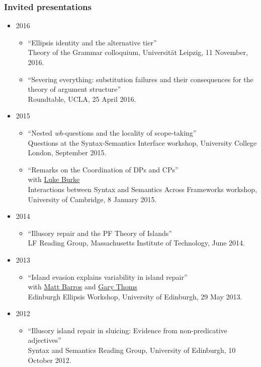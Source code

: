 \documentclass[]{article}
\providecommand{\tightlist}{%
  \setlength{\itemsep}{0pt}\setlength{\parskip}{0pt}}
\begin{document}
\subsubsection{Invited presentations}\label{invited-presentations}

\begin{itemize}
\tightlist
\item
  2016

  \begin{itemize}
  \tightlist
  \item
    ``Ellipsis identity and the alternative tier''\\
    Theory of the Grammar colloquium, Universität Leipzig, 11 November,
    2016.
  \item
    ``Severing everything: substitution failures and their consequences
    for the theory of argument structure''\\
    Roundtable, UCLA, 25 April 2016.
  \end{itemize}
\item
  2015

  \begin{itemize}
  \tightlist
  \item
    ``Nested \emph{wh}-questions and the locality of scope-taking''\\
    Questions at the Syntax-Semantics Interface workshop, University
    College London, September 2015.
  \item
    ``Remarks on the Coordination of DPs and CPs''\\
    with \href{...}{Luke Burke}\\
    Interactions between Syntax and Semantics Across Frameworks
    workshop, University of Cambridge, 8 January 2015.
  \end{itemize}
\item
  2014

  \begin{itemize}
  \tightlist
  \item
    ``Illusory repair and the PF Theory of Islands''\\
    LF Reading Group, Massachusetts Institute of Technology, June 2014.
  \end{itemize}
\item
  2013

  \begin{itemize}
  \tightlist
  \item
    ``Island evasion explains variability in island repair''\\
    with \href{...}{Matt Barros} and \href{...}{Gary Thoms}\\
    Edinburgh Ellipsis Workshop, University of Edinburgh, 29 May 2013.
  \end{itemize}
\item
  2012

  \begin{itemize}
  \tightlist
  \item
    ``Illusory island repair in sluicing: Evidence from non-predicative
    adjectives''\\
    Syntax and Semantics Reading Group, University of Edinburgh, 10
    October 2012.
  \end{itemize}
\end{itemize}
\end{document}
